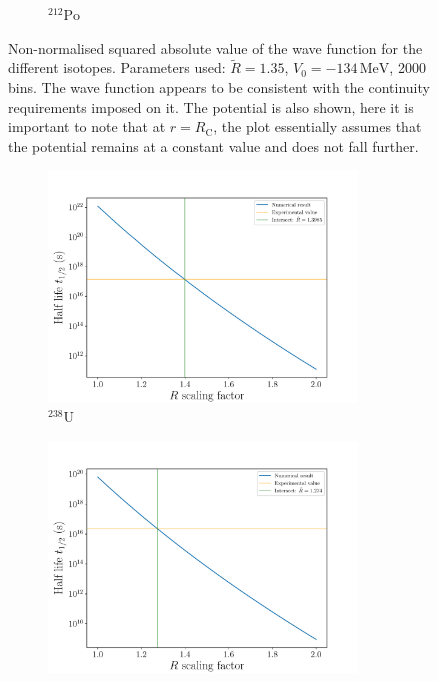\documentclass[a4paper,DIV=12,english]{scrartcl}
\begin{document}
\begin{figure}
\begin{subfigure}{0.49\textwidth}
        \caption{$^{212}\text{Po}$}
        \label{subfig:density_po212}
    \end{subfigure}
    \caption{Non-normalised squared absolute value of the wave function for the different isotopes. Parameters used: $\tilde R = 1.35$, $V_0 = - 134\,\text{MeV}$, 2000 bins. The wave function appears to be consistent with the continuity requirements imposed on it. The potential is also shown, here it is important to note that at $r=R_\text{C}$, the plot essentially assumes that the potential remains at a constant value and does not fall further.}
    \label{fig:density}
\end{figure}

\begin{figure}
    \centering
    \begin{subfigure}{0.49\textwidth}
        \centering
        \includegraphics[width=0.9\textwidth]{../plots/R_dependence/R_u238.pdf}
        \caption{$^{238}\text{U}$}
        \label{subfig:r_u238}
    \end{subfigure}
    \begin{subfigure}{0.49\textwidth}
        \centering
        \includegraphics[width=0.9\textwidth]{../plots/R_dependence/R_u235.pdf}

\end{subfigure}
\end{figure}
\end{document}
